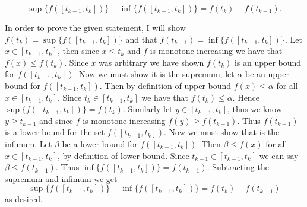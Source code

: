 \documentclass[11pt]{exam}
\begin{document}
\begin{enumerate}
        \[
        \sup\{f([t_{k-1}, t_k])\} - \inf\{f([t_{k-1}, t_k])\} = f(t_k) - f(t_{k-1}).
        \]
            \begin{solution}
                In order to prove the given statement, I will show $f(t_k) = \sup\{f([t_{k-1}, t_k])\}$ and that $f(t_{k-1}) = \inf\{f([t_{k-1}, t_k])\}$. Let $x \in [t_{k-1}, t_k]$, then since $x \le t_k$ and $f$ is monotone increasing we have that $f(x) \le f(t_k)$. Since $x$ was arbitrary we have shown $f(t_k)$ is an upper bound for $f([t_{k-1}, t_k])$. Now we must show it is the supremum, let $\alpha$ be an upper bound for $f([t_{k-1}, t_k])$. Then by definition of upper bound $f(x) \le \alpha$ for all $x \in [t_{k-1}, t_k]$. Since $t_k \in [t_{k-1}, t_k]$ we have that $f(t_k) \leq \alpha$. Hence $\sup\{f([t_{k-1}, t_k])\}= f(t_k)$. Similarly let $y \in [t_{k-1},t_k]$, thus we know $y \ge t_{k-1}$ and since $f$ is monotone increasing $f(y) \ge f(t_{k-1})$. Thus $f(t_{k-1})$ is a lower bound for the set $f([t_{k-1}, t_k])$. Now we must show that is the infimum. Let $\beta$ be a lower bound for $f([t_{k-1}, t_k])$. Then 
                $\beta \le f(x)$ for all $x \in [t_{k-1}, t_k]$, by definition of lower bound. Since $t_{k-1} \in [t_{k-1}, t_k]$ we can say $\beta \le f(t_{k-1})$. Thus $\inf\{f([t_{k-1}, t_k])\} = f(t_{k-1})$. Subtracting the supremum and infimum
                we get 
                $$ \sup\{f([t_{k-1}, t_k])\} - \inf\{f([t_{k-1}, t_k])\} = f(t_k) - f(t_{k-1})$$
                as desired. 
            \end{solution}
    \end{enumerate}
\end{document}

